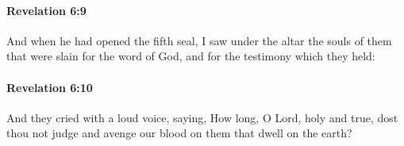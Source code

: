 		\paragraph{Revelation 6:9} %
			\label{REVELATIONNT-6-9}

			And when he had opened the fifth seal, I saw under the altar the souls of them that were slain for the word of God, and for the testimony which they held:

			\begin{framed}
			\scriptsize
				\begin{compactdesc}
					\item[SBLG] 
				\end{compactdesc}
			\end{framed}

		\paragraph{Revelation 6:10} %
			\label{REVELATIONNT-6-10}

			And they cried with a loud voice, saying, How long, O Lord, holy and true, dost thou not judge and avenge our blood on them that dwell on the earth?

